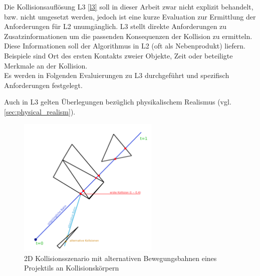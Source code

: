 Die Kollisionsauflösung L3 \ref{l3} soll in dieser Arbeit zwar nicht explizit behandelt, bzw. nicht umgesetzt werden, jedoch ist eine kurze Evaluation zur Ermittlung der Anforderungen für L2 unumgänglich.
L3 stellt direkte Anforderungen zu Zusatzinformationen um die passenden Konsequenzen der Kollision zu ermitteln. Diese Informationen soll der Algorithmus in L2 (oft als Nebenprodukt) liefern. Beispiele sind Ort des ersten Kontakts zweier Objekte, Zeit oder beteiligte Merkmale an der Kollision.\\

Es werden in Folgenden Evaluierungen zu L3 durchgeführt und spezifisch Anforderungen festgelegt.

Auch in L3 gelten Überlegungen bezüglich physikalischem Realismus (vgl. \ref{sec:physical_realism}).

\begin{figure}
	\centering
	\includegraphics[width=0.6\textwidth]{./res/l3_col.png}
	\caption{2D Kollisionsszenario mit alternativen Bewegungsbahnen eines Projektils an Kollisionskörpern}
	\label{fig:l3col}
\end{figure}

